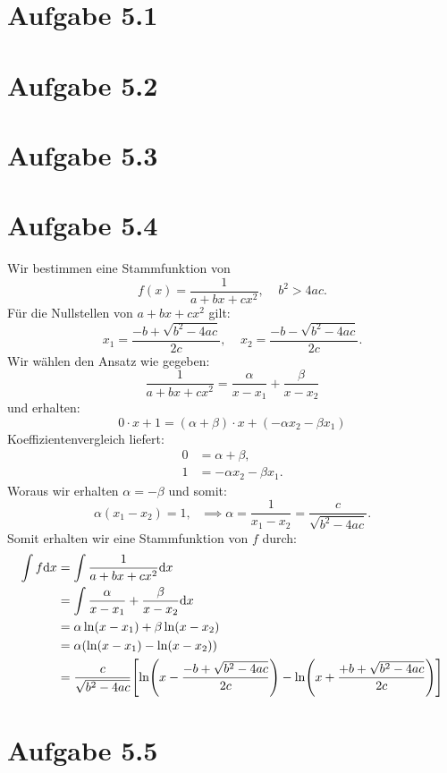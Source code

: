 \documentclass{theozettel}
\begin{document}

\section*{Aufgabe 5.1}


\newpage
\section*{Aufgabe 5.2}


\newpage
\section*{Aufgabe 5.3}


\newpage
\section*{Aufgabe 5.4}
Wir bestimmen eine Stammfunktion von 
	\[
		f(x) = \frac{1}{a+bx+cx^2}, \ \ \ \ \ b^{2} > 4ac.
	\]
Für die Nullstellen von $a+bx+cx^{2}$ gilt:
	\[
		x_{1} = \frac{-b + \sqrt{b^{2}-4ac}}{2c}, \ \ \ \ \ x_{2} = \frac{-b - \sqrt{b^{2}-4ac}}{2c}.
	\]
Wir wählen den Ansatz wie gegeben:
	\[
		\frac{1}{a+bx+cx^2} = \frac{\alpha}{x-x_{1}} + \frac{\beta}{x-x_{2}}
	\]
und erhalten:
	\[
		0 \cdot x + 1 = (\alpha + \beta) \cdot x + (- \alpha x_{2} - \beta x_{1})
	\]
Koeffizientenvergleich liefert:
	\begin{align*}
		0 &= \alpha + \beta, \\
		1 &= -\alpha x_{2} - \beta x_{1}.
	\end{align*}
Woraus wir erhalten $\alpha = - \beta$ und somit:
	\[
		\alpha (x_{1} - x_{2}) = 1, \ \ \ \implies \alpha = \frac{1}{x_{1} - x_{2}} = \frac{c}{\sqrt{b^{2}-4ac}}.
	\]
Somit erhalten wir eine Stammfunktion von $f$ durch:
	\begin{align*}
		\int f \dd x &= \int \frac{1}{a+bx+cx^2} \dd x \\
		&= \int \frac{\alpha}{x-x_{1}} + \frac{\beta}{x-x_{2}} \dd x \\
		&= \alpha \ln(x-x_{1}) + \beta \ln(x-x_{2}) \\
		&= \alpha \qty(\ln(x-x_{1}) - \ln(x-x_{2})) \\
		&= \frac{c}{\sqrt{b^{2}-4ac}} \qty[ \ln(x - \frac{-b + \sqrt{b^{2}-4ac}}{2c}) - \ln(x + \frac{+b + \sqrt{b^{2}-4ac}}{2c}) ]
	\end{align*}


\newpage
\section*{Aufgabe 5.5}
\end{document}
